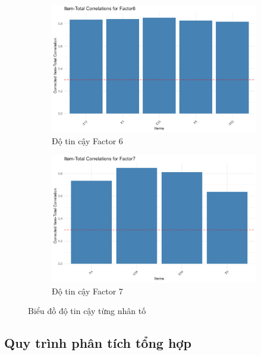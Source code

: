 \begin{figure}[h!]
    \vskip 0.5cm
    \begin{subfigure}[b]{0.45\linewidth}
        \centering
        \includegraphics[width=\linewidth]{../../assets/images/reliability_Factor6.png}
        \caption{Độ tin cậy Factor 6}
        \label{fig:reliability_f6}
    \end{subfigure}
    \hfill
    \begin{subfigure}[b]{0.45\linewidth}
        \centering
        \includegraphics[width=\linewidth]{../../assets/images/reliability_Factor7.png}
        \caption{Độ tin cậy Factor 7}
        \label{fig:reliability_f7}
    \end{subfigure}

    \caption{Biểu đồ độ tin cậy từng nhân tố}
    \label{fig:efa_reliability}
\end{figure}

\subsection{Quy trình phân tích tổng hợp}


